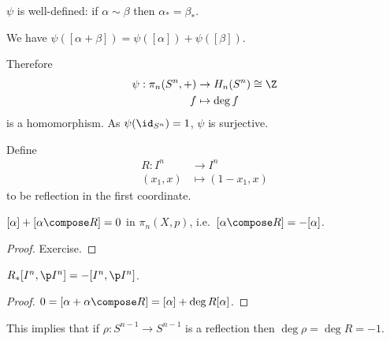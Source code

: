 \documentclass[a4paper]{article}
\renewcommand{\b}{\p}
\begin{document}
\(\psi\) is well-defined: if \(\alpha \sim \beta\) then \(\alpha_* = \beta_*\).

\begin{proposition}
  We have \(\psi([\alpha + \beta]) = \psi([\alpha]) + \psi([\beta])\).
\end{proposition}

Therefore
\begin{align*}
  \psi: \pi_n(S^n, +) &\to H_n(S^n) \cong \Z \\
  f &\mapsto \deg f
\end{align*}
is a homomorphism. As \(\psi(\id_{S^n}) = 1\), \(\psi\) is surjective.

Define
\begin{align*}
  R: I^n &\to I^n \\
  (x_1, x) &\mapsto (1 - x_1, x)
\end{align*}
to be reflection in the first coordinate.

\begin{lemma}
  \([\alpha] + [\alpha \compose R] = 0\) in \(\pi_n(X, p)\), i.e.\ \([\alpha \compose R] = -[\alpha]\).
\end{lemma}

\begin{proof}
  Exercise.
\end{proof}

\begin{corollary}
  \(R_*[I^n, \b I^n] = -[I^n, \b I^n]\).
\end{corollary}

\begin{proof}
  \(0 = [\alpha + \alpha \compose R] = [\alpha] + \deg R [\alpha]\).
\end{proof}
This implies that if \(\rho: S^{n - 1} \to S^{n - 1}\) is a reflection then \(\deg \rho = \deg R = -1\).

















\printindex
\end{document}
